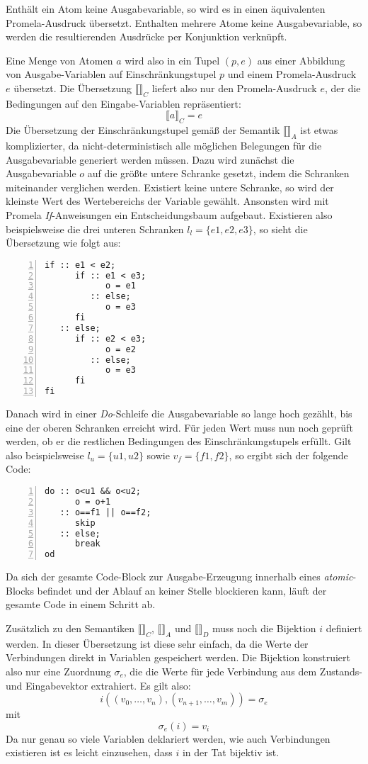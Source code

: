 Enthält ein Atom keine Ausgabevariable, so wird es in einen äquivalenten Promela-Ausdruck übersetzt.
Enthalten mehrere Atome keine Ausgabevariable, so werden die resultierenden Ausdrücke per Konjunktion verknüpft.

Eine Menge von Atomen $a$ wird also in ein Tupel $(p,e)$ aus einer Abbildung von Ausgabe-Variablen auf Einschränkungstupel $p$ und einem Promela-Ausdruck $e$ übersetzt.
Die Übersetzung $\llbracket \rrbracket_C$ liefert also nur den Promela-Ausdruck $e$, der die Bedingungen auf den Eingabe-Variablen repräsentiert:
\[ \llbracket a\rrbracket_C = e \]
Die Übersetzung der Einschränkungstupel gemäß der Semantik $\llbracket\rrbracket_A$ ist etwas komplizierter, da nicht-deterministisch alle möglichen Belegungen für die Ausgabevariable generiert werden müssen.
Dazu wird zunächst die Ausgabevariable $o$ auf die größte untere Schranke gesetzt, indem die Schranken miteinander verglichen werden.
Existiert keine untere Schranke, so wird der kleinste Wert des Wertebereichs der Variable gewählt.
Ansonsten wird mit Promela \emph{If}-Anweisungen ein Entscheidungsbaum aufgebaut.
Existieren also beispielsweise die drei unteren Schranken $l_l = \{ e1,e2,e3\}$, so sieht die Übersetzung wie folgt aus:
\begin{lstlisting}[language=promela,numbers=left,caption={Berechnung der unteren Schranke}]
if :: e1 < e2;
      if :: e1 < e3;
            o = e1
         :: else;
            o = e3
      fi
   :: else;
      if :: e2 < e3;
            o = e2
         :: else;
            o = e3
      fi
fi
\end{lstlisting}
Danach wird in einer \emph{Do}-Schleife die Ausgabevariable so lange hoch gezählt, bis eine der oberen Schranken erreicht wird.
Für jeden Wert muss nun noch geprüft werden, ob er die restlichen Bedingungen des Einschränkungstupels erfüllt.
Gilt also beispielsweise $l_u = \{ u1,u2 \}$ sowie $v_f=\{ f1, f2 \}$, so ergibt sich der folgende Code:
\begin{lstlisting}[language=promela,numbers=left,firstnumber=last,caption={Generierung von möglichen Werten}]
do :: o<u1 && o<u2;
      o = o+1
   :: o==f1 || o==f2;
      skip
   :: else;
      break
od
\end{lstlisting}
Da sich der gesamte Code-Block zur Ausgabe-Erzeugung innerhalb eines \emph{atomic}-Blocks befindet und der Ablauf an keiner Stelle blockieren kann, läuft der gesamte Code in einem Schritt ab.

Zusätzlich zu den Semantiken $\llbracket\rrbracket_C$, $\llbracket\rrbracket_A$ und $\llbracket\rrbracket_D$ muss noch die Bijektion $i$ definiert werden.
In dieser Übersetzung ist diese sehr einfach, da die Werte der Verbindungen direkt in Variablen gespeichert werden.
Die Bijektion konstruiert also nur eine Zuordnung $\sigma_e$, die die Werte für jede Verbindung aus dem Zustands- und Eingabevektor extrahiert.
Es gilt also:
\[ i((v_0,\dots,v_n),(v_{n+1},\dots,v_m)) = \sigma_e \]
mit
\[ \sigma_e(i) = v_i \]
Da nur genau so viele Variablen deklariert werden, wie auch Verbindungen existieren ist es leicht einzusehen, dass $i$ in der Tat bijektiv ist.


